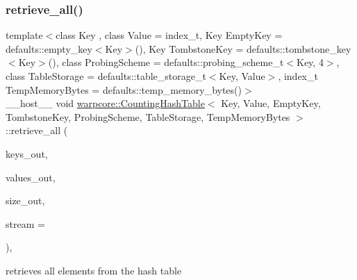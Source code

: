 \subsubsection{\texorpdfstring{retrieve\+\_\+all()}{retrieve\_all()}}
{\footnotesize\ttfamily template$<$class Key , class Value  = index\+\_\+t, Key Empty\+Key = defaults\+::empty\+\_\+key$<$\+Key$>$(), Key Tombstone\+Key = defaults\+::tombstone\+\_\+key$<$\+Key$>$(), class Probing\+Scheme  = defaults\+::probing\+\_\+scheme\+\_\+t$<$\+Key, 4$>$, class Table\+Storage  = defaults\+::table\+\_\+storage\+\_\+t$<$\+Key, Value$>$, index\+\_\+t Temp\+Memory\+Bytes = defaults\+::temp\+\_\+memory\+\_\+bytes()$>$ \\
\+\_\+\+\_\+host\+\_\+\+\_\+ void \hyperlink{classwarpcore_1_1CountingHashTable}{warpcore\+::\+Counting\+Hash\+Table}$<$ Key, Value, Empty\+Key, Tombstone\+Key, Probing\+Scheme, Table\+Storage, Temp\+Memory\+Bytes $>$\+::retrieve\+\_\+all (\begin{DoxyParamCaption}\item[{key\+\_\+type $\ast$}]{keys\+\_\+out,  }\item[{value\+\_\+type $\ast$}]{values\+\_\+out,  }\item[{index\+\_\+t \&}]{size\+\_\+out,  }\item[{cuda\+Stream\+\_\+t}]{stream = {} }\end{DoxyParamCaption})\hspace{0.3cm}{\ttfamily [inline]}, {\ttfamily [noexcept]}}



retrieves all elements from the hash table 


